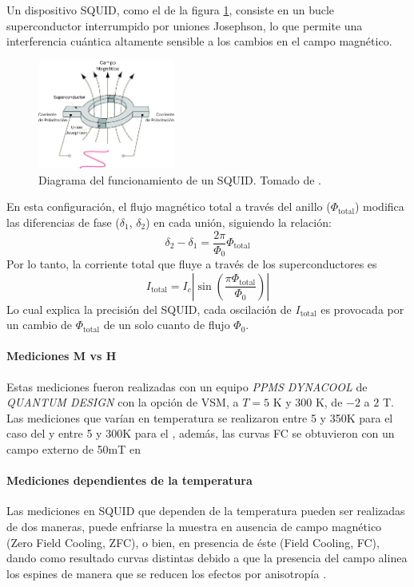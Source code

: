 \documentclass[../main.tex]{subfiles}
\begin{document}
Un dispositivo SQUID, como el de la figura \ref{fig:squiddiag}, consiste en un bucle superconductor interrumpido por uniones Josephson, lo que permite una interferencia cuántica altamente sensible a los cambios en el campo magnético.

\begin{figure}[H]
    \centering
    \includegraphics[width=0.4\textwidth]{fig/squiddiag.png}
    \caption{Diagrama del funcionamiento de un SQUID. Tomado de \cite{Marcon2012}.}
    \label{fig:squiddiag}
\end{figure}
En esta configuración, el flujo magnético total a través del anillo ($\Phi_\text{total}$) modifica las diferencias de fase ($\delta_1$, $\delta_2$) en cada unión, siguiendo la relación:
\begin{equation}
    \delta_2-\delta_1=\dfrac{2\pi}{\Phi_0}\Phi_\text{total}
    \label{eq:flujoSQUID}
\end{equation}
Por lo tanto, la corriente total que fluye a través de los superconductores es
\begin{equation}
    I_\text{total}=I_c\left|\sin\left(\dfrac{\pi\Phi_\text{total}}{\Phi_0}\right)\right|
    \label{eq:corrienteSQUID}
\end{equation}
Lo cual explica la precisión del SQUID, cada oscilación de $I_\text{total}$ es provocada por un cambio de $\Phi_\text{total}$ de un solo cuanto de flujo $\Phi_0$.
\paragraph{Mediciones M vs H}
Estas mediciones fueron realizadas con un equipo \textit{PPMS DYNACOOL} de \textit{QUANTUM DESIGN} con la opción de VSM, a $T=5$ K y $300$ K, de $-2$ a $2$ T.
Las mediciones que varían en temperatura se realizaron entre 5 y 350K para el caso del \sama{} y entre 5 y 300K para el \neod{}, además, las curvas FC se obtuvieron con un campo externo de 50mT en 
\paragraph{Mediciones dependientes de la temperatura}
Las mediciones en SQUID que dependen de la temperatura pueden ser realizadas de dos maneras, puede enfriarse la muestra en ausencia de campo magnético (Zero Field Cooling, ZFC), o bien, en presencia de éste (Field Cooling, FC), dando como resultado curvas distintas debido a que la presencia del campo alinea los espines de manera que se reducen los efectos por anisotropía \cite{Ali2014}.
\end{document}
